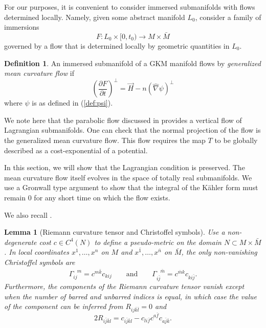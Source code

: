\documentclass[12pt,letterpaper]{amsart}%
\newcounter{mycounter}
\numberwithin{mycounter}{section}
\theoremstyle{plain}
\newtheorem{lemma}[mycounter]{Lemma}
\numberwithin{equation}{section}
\theoremstyle{definition}
\newtheorem{definition}[mycounter]{Definition}
\begin{document}
For our purposes, it is convenient to consider immersed submanifolds with flows determined locally. 
 Namely,  given some abstract manifold $L_0$, consider a family of immersions  
$$ F: L_0 \times [0,t_0) \rightarrow M\times\bar{M} $$ governed by a flow that is determined locally by geometric quantities in $L_0$. 

\begin{definition}\label{def:gmcf}
An immersed submanifold of a GKM manifold flows by \textit{generalized mean curvature flow} if %
\begin{equation}\label{GKMMCF}
\left(  \frac{\partial F}{\partial t}\right)  ^{\perp}=\vec H-n\left(  \hat\nabla
\psi\right)  ^{\perp}%
\end{equation}
where $\psi$ is as defined in (\ref{def:psi}).
\end{definition}

We note here that the parabolic flow discussed in \cite{KSW} provides a
vertical flow of Lagrangian submanifolds. One can check that the normal projection of
the flow is the generalized mean curvature flow.  This flow requires the map $T$ \cite{KSW} to be globally described as a cost-exponential of a potential.  





In this section, we will show that the Lagrangian condition is preserved.   The mean curvature flow itself evolves in the space of totally real submanifolds.  We use a Gronwall type argument to show that the integral of the K\"ahler form must remain 0 for any short time on which the flow exists.  

We also recall \cite[Lemma 4.1]{KM}.
\begin{lemma}[Riemann curvature tensor and Christoffel symbols] \label{KM41}
Use a non-degenerate cost $c \in C^{4}(N)$ to define a pseudo-metric on the domain 
$N \subset M \times \bar M$. In local coordinates $x^1,\ldots,x^n$ on $M$ and 
$x^{\bar 1},\ldots,x^{\bar n}$ on $\bar M$, the only non-vanishing Christoffel symbols are
\begin{equation}\label{eq:Gamma}
\Gamma_{ij}^{\phantom{ij}m} = c^{m\bar k} c_{kij}
\qquad\text{and}\qquad
\Gamma_{i\bar j}^{\phantom{i\bar j}\bar m} = c^{\bar m k} c_{k i \bar j}.
\end{equation}
Furthermore, the components of the Riemann curvature tensor vanish except when the
number of barred and unbarred indices is equal, in which case the value of the component
can be inferred from $R_{ij \bar k \bar l} = 0$ and
\begin{equation}\label{eq:Rijkl}
2 R_{i\bar j \bar k l}
  = c_{i\bar{j} \bar{k} l} - c_{l i \bar f} c^{ a \bar f} c_{ a \bar j \bar k}.
\end{equation}
\end{lemma}
\end{document}
